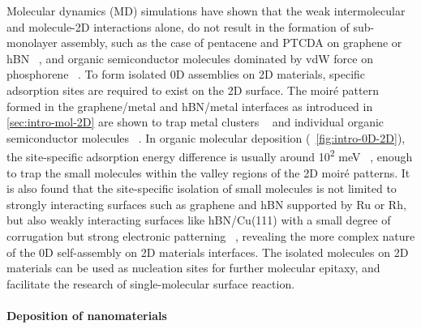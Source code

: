 Molecular dynamics (MD) simulations have shown that the weak
intermolecular and molecule-2D interactions alone, do not result in
the formation of sub-monolayer assembly, such as the case of pentacene
and PTCDA on graphene or hBN ~\autocite{Zhao_2015_self_assemb_gr_MD}, and
organic semiconductor molecules dominated by vdW force on phosphorene
~\autocite{Mukhopadhyay_2017_cryst_BP}.
% 
To form isolated 0D assemblies on 2D materials, specific adsorption sites are
required to exist on the 2D surface.
% 
The moiré pattern formed in the graphene/metal and hBN/metal
interfaces as introduced in \autoref{sec:intro-mol-2D} are shown to
trap metal clusters
~\autocite{Goriachko_2007_assembl_hBN_ru,Pan_2009_Pt_cluster_gr,Wang_2011_gr_hBN_metal_cl,Zhang_2014_metal_gr_Ru}
and individual organic semiconductor molecules
~\autocite{Joshi_2014_TCNQ_hBN,Dil_2008_hBN_Rh,Lu_2012_c60_gr_moire}.
%
In organic molecular deposition (~\autoref{fig:intro-0D-2D}),
the site-specific adsorption energy difference is usually around
10\textsuperscript{2} meV
~\autocite{Lu_2012_c60_gr_moire,Iannuzzi_2014_MPc_hBN_Rh}, enough to
trap the small molecules within the valley regions of the 2D moiré
patterns. It is also found that the site-specific isolation of small
molecules is not limited to strongly interacting surfaces such as
graphene and hBN supported by Ru or Rh, but also weakly interacting
surfaces like hBN/Cu(111) with a small degree of corrugation but
strong electronic patterning
~\autocite{Joshi_2012_hBN_Cu,Joshi_2014_TCNQ_hBN}, revealing the more
complex nature of the 0D self-assembly on 2D materials interfaces.
%
The isolated molecules on 2D materials can be used as nucleation sites
for further molecular epitaxy, and facilitate the research of
single-molecular surface reaction.


\paragraph{Deposition of nano\-materials}


